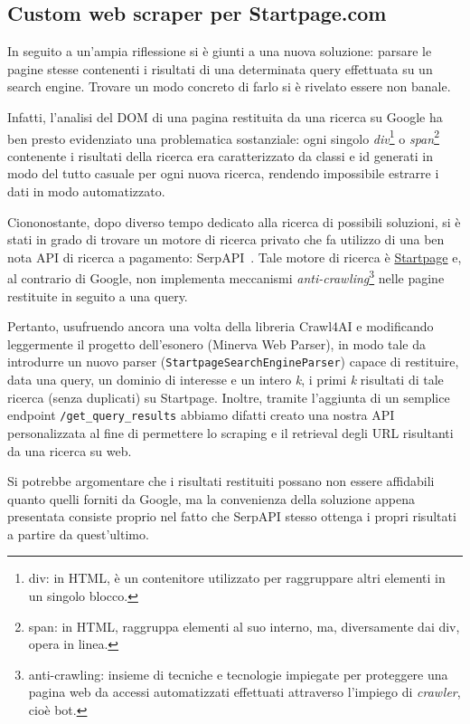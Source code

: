 \subsection{Custom web scraper per Startpage.com}
In seguito a un'ampia riflessione si è giunti a una nuova soluzione: parsare le pagine stesse contenenti i risultati di una determinata query effettuata su un search engine. Trovare un modo concreto di farlo si è rivelato essere non banale.

Infatti, l'analisi del DOM di una pagina restituita da una ricerca su Google ha ben presto evidenziato una problematica sostanziale: ogni singolo \textit{div}\footnote{div: in HTML, è un contenitore utilizzato per raggruppare altri elementi in un singolo blocco.} o \textit{span}\footnote{span: in HTML, raggruppa elementi al suo interno, ma, diversamente dai div, opera in linea.} contenente i risultati della ricerca era caratterizzato da classi e id generati in modo del tutto casuale per ogni nuova ricerca, rendendo impossibile estrarre i dati in modo automatizzato.

Ciononostante, dopo diverso tempo dedicato alla ricerca di possibili soluzioni, si è stati in grado di trovare un motore di ricerca privato che fa utilizzo di una ben nota API di ricerca a pagamento: SerpAPI~\cite{serpapi_docs}. Tale motore di ricerca è \href{https://www.startpage.com}{Startpage} e, al contrario di Google, non implementa meccanismi \textit{anti-crawling}\footnote{anti-crawling: insieme di tecniche e tecnologie impiegate per proteggere una pagina web da accessi automatizzati effettuati attraverso l'impiego di \textit{crawler}, cioè bot.} nelle pagine restituite in seguito a una query.

Pertanto, usufruendo ancora una volta della libreria Crawl4AI e modificando leggermente il progetto dell'esonero (Minerva Web Parser), in modo tale da introdurre un nuovo parser (\texttt{StartpageSearchEngineParser}) capace di restituire, data una query, un dominio di interesse e un intero \textit{k}, i primi \textit{k} risultati di tale ricerca (senza duplicati) su Startpage. Inoltre, tramite l'aggiunta di un semplice endpoint \texttt{/get\_query\_results} abbiamo difatti creato una nostra API personalizzata al fine di permettere lo scraping e il retrieval degli URL risultanti da una ricerca su web.

Si potrebbe argomentare che i risultati restituiti possano non essere affidabili quanto quelli forniti da Google, ma la convenienza della soluzione appena presentata consiste proprio nel fatto che SerpAPI stesso ottenga i propri risultati a partire da quest'ultimo.

